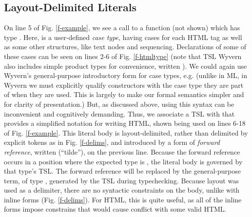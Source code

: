 \subsection{Layout-Delimited Literals}


On line 5 of Fig. \ref{f-example}, we see a call to a function  (not shown) which has type . Here,  is a user-defined \emph{case type}, having cases for each HTML tag as well as some other structures, like text nodes and sequencing. Declarations  of some of these cases can be seen on lines 2-6 of Fig. \ref{f-htmltype} (note that TSL Wyvern also includes simple product types for convenience, written ). We could again use Wyvern's general-purpose introductory form for case types, e.g.  ({unlike in ML, in Wyvern we must explicitly qualify constructors with the case type they are part of when they are used}. This is largely to make our formal semantics simpler and for clarity of presentation.) But, as discussed above, using this syntax can be inconvenient and  cognitively demanding. Thus, we associate a TSL with  that provides a simplified notation for writing HTML, shown being used on lines 6-18 of Fig. \ref{f-example}. This literal body is layout-delimited, rather than delimited by explicit tokens as in Fig. \ref{f-delims}, and introduced by a form of \emph{forward reference}, written \li{~} (``tilde''), on the previous line. Because the forward reference occurs in a position where the expected type is , the literal body is governed by that type's TSL. The forward reference will be replaced by the general-purpose term, of type , generated by the TSL during typechecking. Because layout was used as a delimiter, there are no syntactic constraints on the body, unlike with inline forms (Fig. \ref{f-delims}). For HTML, this is quite useful, as all of the inline forms impose constrains that would cause conflict with some valid HTML.
